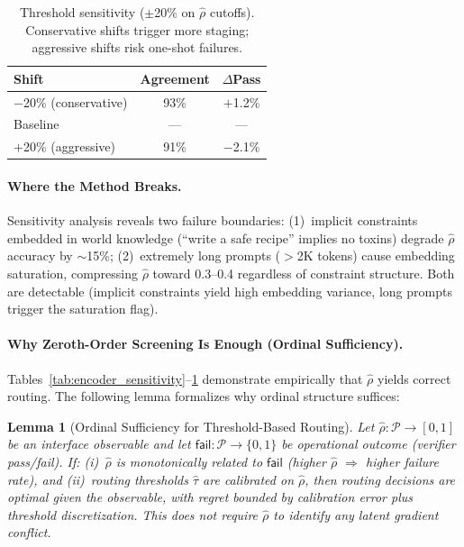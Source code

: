 \documentclass{article}
\theoremstyle{plain}
\newtheorem{lemma}[theorem]{Lemma}
\theoremstyle{definition}
\theoremstyle{remark}
\newcommand{\rhohat}{\hat{\rho}}
\begin{document}
\begin{table}[ht]
\centering
\footnotesize
\caption{Threshold sensitivity ($\pm$20\% on $\rhohat$ cutoffs). Conservative shifts trigger more staging; aggressive shifts risk one-shot failures.}
\label{tab:threshold_sensitivity}
\begin{tabular}{lcc}
\toprule
Shift & Agreement & $\Delta$Pass \\
\midrule
$-$20\% (conservative) & 93\% & $+$1.2\% \\
Baseline & --- & --- \\
$+$20\% (aggressive) & 91\% & $-$2.1\% \\
\bottomrule
\end{tabular}
\end{table}

\paragraph{Where the Method Breaks.}
Sensitivity analysis reveals two failure boundaries: (1)~implicit constraints embedded in world knowledge (``write a safe recipe'' implies no toxins) degrade $\rhohat$ accuracy by $\sim$15\%; (2)~extremely long prompts ($>$2K tokens) cause embedding saturation, compressing $\rhohat$ toward 0.3--0.4 regardless of constraint structure. Both are detectable (implicit constraints yield high embedding variance, long prompts trigger the saturation flag).

\paragraph{Why Zeroth-Order Screening Is Enough (Ordinal Sufficiency).}
Tables~\ref{tab:encoder_sensitivity}--\ref{tab:threshold_sensitivity} demonstrate empirically that $\rhohat$ yields correct routing. The following lemma formalizes why ordinal structure suffices:

\begin{lemma}[Ordinal Sufficiency for Threshold-Based Routing]\label{lem:proxy_sufficiency}
Let $\rhohat: \mathcal{P} \to [0,1]$ be an interface observable and let $\mathsf{fail}: \mathcal{P} \to \{0,1\}$ be operational outcome (verifier pass/fail). If: (i)~$\rhohat$ is monotonically related to $\mathsf{fail}$ (higher $\rhohat$ $\Rightarrow$ higher failure rate), and (ii)~routing thresholds $\hat{\tau}$ are calibrated on $\rhohat$, then routing decisions are optimal given the observable, with regret bounded by calibration error plus threshold discretization. This does not require $\rhohat$ to identify any latent gradient conflict.
\end{lemma}
\end{document}
